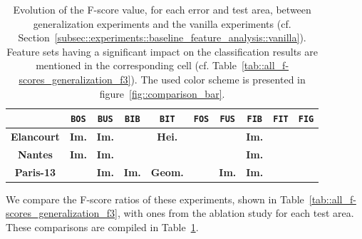         \begin{table}[htbp]
            \footnotesize 
            \centering
            \renewcommand{\arraystretch}{2}
            \begin{tabular}{| c | c c c c |c c c c c|}
                \hline
                & \texttt{BOS} & \texttt{BUS} & \texttt{BIB} & \texttt{BIT} & \texttt{FOS} & \texttt{FUS} & \texttt{FIB} & \texttt{FIT} & \texttt{FIG} \\
                \hline
                \textbf{Elancourt} & \cellcolor{LOSS3545} \textbf{Im.} & \cellcolor{LOSS3545} \textbf{Im.} & \cellcolor{LOSS2535} & \cellcolor{LOSS1525} \textbf{Hei.} & \cellcolor{STBL} & \cellcolor{GAIN45} & \cellcolor{GAIN2535} \textbf{Im.} & \cellcolor{LOSS1525} & \cellcolor{GAIN0515} \\
                \textbf{Nantes} & \cellcolor{STBL} \textbf{Im.} & \cellcolor{LOSS1525} \textbf{Im.} &  & \cellcolor{GAIN1525} & \cellcolor{STBL} & \cellcolor{STBL} & \cellcolor{LOSS0515} \textbf{Im.} & & \cellcolor{STBL} \\
                \textbf{Paris-13} & \cellcolor{LOSS0515} & \cellcolor{STBL} \textbf{Im.} & \cellcolor{GAIN1525} \textbf{Im.} & \cellcolor{GAIN0515} \textbf{Geom.} & \cellcolor{STBL} & \cellcolor{LOSS45} \textbf{Im.} & \cellcolor{STBL} \textbf{Im.} & \cellcolor{GAIN0515} & \cellcolor{LOSS0515} \\
                \hline
            \end{tabular}
            \renewcommand{\arraystretch}{1}
            \caption[
                Evolution of the F-score value, for each error and test area, between generalization experiments and the vanilla experiments.
            ]{
                \label{tab::generalization_comparison}
                Evolution of the F-score value, for each error and test area, between generalization experiments and the vanilla experiments (cf. Section~\ref{subsec::experiments::baseline_feature_analysis::vanilla}).
                Feature sets having a significant impact on the classification results are mentioned in the corresponding cell (cf. Table~\ref{tab::all_f-scores_generalization_f3}).
                The used color scheme is presented in figure~\ref{fig::comparison_bar}.
            }
        \end{table}
            
        We compare the F-score ratios of these experiments, shown in Table~\ref{tab::all_f-scores_generalization_f3}, with ones from the ablation study for each test area.
        These comparisons are compiled in Table~\ref{tab::generalization_comparison}.\\
    
